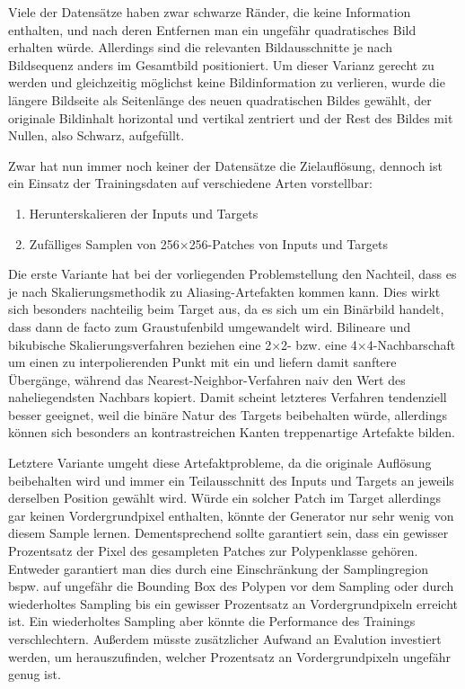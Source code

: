 Viele der Datensätze haben zwar schwarze Ränder, die keine Information enthalten, und nach deren Entfernen man ein ungefähr quadratisches Bild erhalten würde.
Allerdings sind die relevanten Bildausschnitte je nach Bildsequenz anders im Gesamtbild positioniert.
Um dieser Varianz gerecht zu werden und gleichzeitig möglichst keine Bildinformation zu verlieren, wurde die längere Bildseite als Seitenlänge des neuen quadratischen Bildes gewählt, der originale Bildinhalt horizontal und vertikal zentriert und der Rest des Bildes mit Nullen, also Schwarz, aufgefüllt.

Zwar hat nun immer noch keiner der Datensätze die Zielauflösung, dennoch ist ein Einsatz der Trainingsdaten auf verschiedene Arten vorstellbar:

\begin{enumerate}
	\item Herunterskalieren der Inputs und Targets
	\item Zufälliges Samplen von 256$\times$256-Patches von Inputs und Targets
\end{enumerate}

Die erste Variante hat bei der vorliegenden Problemstellung den Nachteil, dass es je nach Skalierungsmethodik zu Aliasing-Artefakten kommen kann.
Dies wirkt sich besonders nachteilig beim Target aus, da es sich um ein Binärbild handelt, dass dann de facto zum Graustufenbild umgewandelt wird.
Bilineare und bikubische Skalierungsverfahren beziehen eine 2$\times$2- bzw. eine 4$\times$4-Nachbarschaft um einen zu interpolierenden Punkt mit ein und liefern damit sanftere Übergänge, während das Nearest-Neighbor-Verfahren naiv den Wert des naheliegendsten Nachbars kopiert.
Damit scheint letzteres Verfahren tendenziell besser geeignet, weil die binäre Natur des Targets beibehalten würde, allerdings können sich besonders an kontrastreichen Kanten treppenartige Artefakte bilden.

Letztere Variante umgeht diese Artefaktprobleme, da die originale Auflösung beibehalten wird und immer ein Teilausschnitt des Inputs und Targets an jeweils derselben Position gewählt wird.
Würde ein solcher Patch im Target allerdings gar keinen Vordergrundpixel enthalten, könnte der Generator nur sehr wenig von diesem Sample lernen.
Dementsprechend sollte garantiert sein, dass ein gewisser Prozentsatz der Pixel des gesampleten Patches zur Polypenklasse gehören.
Entweder garantiert man dies durch eine Einschränkung der Samplingregion bspw. auf ungefähr die Bounding Box des Polypen vor dem Sampling oder durch wiederholtes Sampling bis ein gewisser Prozentsatz an Vordergrundpixeln erreicht ist.
Ein wiederholtes Sampling aber könnte die Performance des Trainings verschlechtern.
Außerdem müsste zusätzlicher Aufwand an Evalution investiert werden, um herauszufinden, welcher Prozentsatz an Vordergrundpixeln ungefähr genug ist.

